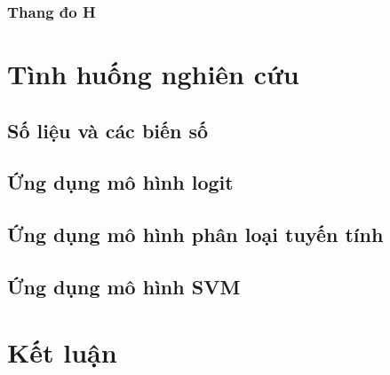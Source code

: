 \documentclass[a4paper]{report}\usepackage[]{graphicx}\usepackage[]{color}
\begin{document}
\subsection{Thang đo H}


\chapter{Tình huống nghiên cứu}


\section{Số liệu và các biến số}


\section{Ứng dụng mô hình logit}

\section{Ứng dụng mô hình phân loại tuyến tính}

\section{Ứng dụng mô hình SVM}


\chapter{Kết luận}


\end{document}
